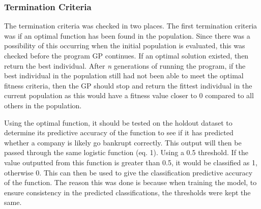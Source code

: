 \documentclass[11pt]{article}
\begin{document}
\subsubsection{Termination Criteria}\label{subsubsec:TC}
The termination criteria was checked in two places. The first termination criteria was if an optimal function has been found in the population. Since there was a possibility of this occurring when the initial population is evaluated, this was checked before the program GP continues. If an optimal solution existed, then return the best individual. After \textit{n} generations of running the program, if the best individual in the population still had not been able to meet the optimal fitness criteria, then the GP should stop and return the fittest individual in the current population as this would have a fitness value closer to 0 compared to all others in the population. 

Using the optimal function, it should be tested on the holdout dataset to determine its predictive accuracy of the function to see if it has predicted whether a company is likely go bankrupt correctly. This output will then be passed through the same logistic function (eq. 1). Using a 0.5 threshold. If the value outputted from this function is greater than 0.5, it would be classified as 1, otherwise 0. This can then be used to give the classification predictive accuracy of the function. The reason this was done is because when training the model, to ensure consistency in the predicted classifications, the thresholds were kept the same.
\end{document}
